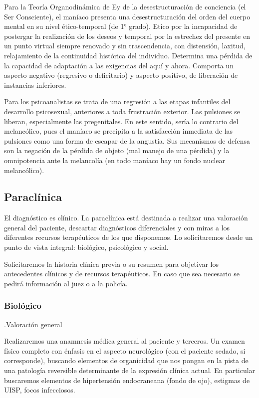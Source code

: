 Para la Teoría Organodinámica de Ey de la desestructuración de conciencia (el Ser Consciente), el maníaco presenta una desestructuración del orden del cuerpo mental en su nivel ético-temporal (de 1° grado). Etico por la incapacidad de postergar la realización de los deseos y temporal por la estrechez del presente en un punto virtual siempre renovado y sin trascendencia, con distensión, laxitud, relajamiento de la continuidad histórica del individuo. Determina una pérdida de la capacidad de adaptación a las exigencias del aquí y ahora. Comporta un aspecto negativo (regresivo o deficitario) y aspecto positivo, de liberación de instancias inferiores.

Para los psicoanalistas se trata de una regresión a las etapas infantiles del desarrollo psicosexual, anteriores a toda frustración exterior. Las pulsiones se liberan, especialmente las pregenitales. En este sentido, sería lo contrario del melancólico, pues el maníaco se precipita a la satisfacción inmediata de las pulsiones como una forma de escapar de la angustia. Sus mecanismos de defensa son la negación de la pérdida de objeto (mal manejo de una pérdida) y la omnipotencia ante la melancolía (en todo maníaco hay un fondo nuclear melancólico).
\subsection*{Paraclínica}
El diagnóstico es clínico. La paraclínica está destinada a realizar una valoración general del paciente, descartar diagnósticos diferenciales y con miras a los diferentes recursos terapéuticos de los que disponemos. Lo solicitaremos desde un punto de vista integral: biológico, psicológico y social.

Solicitaremos la historia clínica previa o su resumen para objetivar los antecedentes clínicos y de recursos terapéuticos. En caso que sea necesario se pedirá información al juez o a la policía.
\subsubsection*{Biológico}
.Valoración general

Realizaremos una anamnesis médica general al paciente y terceros. Un examen físico completo con énfasis en el aspecto neurológico (con el paciente sedado, si corresponde), buscando elementos de organicidad que nos pongan en la pista de una patología reversible determinante de la expresión clínica actual. En particular buscaremos elementos de hipertensión endocraneana (fondo de ojo), estigmas de UISP, focos infecciosos.

